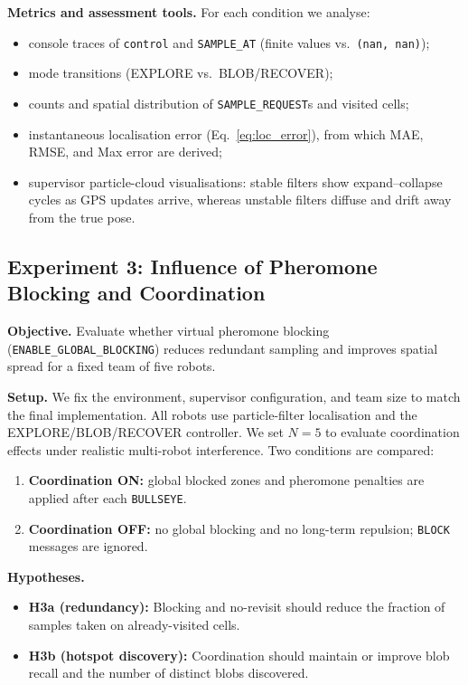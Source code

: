 \documentclass[lettersize,journal]{IEEEtran}
\begin{document}
\textbf{Metrics and assessment tools.}
For each condition we analyse:
\begin{itemize}
    \item console traces of \texttt{control} and \texttt{SAMPLE\_AT}
    (finite values vs.\ \texttt{(nan, nan)});
    \item mode transitions (EXPLORE vs.\ BLOB/RECOVER);
    \item counts and spatial distribution of \texttt{SAMPLE\_REQUEST}s
    and visited cells;
    \item instantaneous localisation error (Eq.~\eqref{eq:loc_error}), from
    which MAE, RMSE, and Max error are derived;
    \item supervisor particle-cloud visualisations: stable filters show
    expand--collapse cycles as GPS updates arrive, whereas unstable filters
    diffuse and drift away from the true pose.
\end{itemize}

\subsection{Experiment 3: Influence of Pheromone Blocking and Coordination }

\textbf{Objective.}
Evaluate whether virtual pheromone blocking
(\texttt{ENABLE\_GLOBAL\_BLOCKING}) reduces redundant sampling and improves
spatial spread for a fixed team of five robots.

\textbf{Setup.}
We fix the environment, supervisor configuration, and team size to match the
final implementation. All robots use particle-filter localisation and the
EXPLORE/BLOB/RECOVER controller. We set $N=5$ to evaluate coordination effects
under realistic multi-robot interference. Two conditions are compared:
\begin{enumerate}
    \item \textbf{Coordination ON:} global blocked zones and pheromone penalties
    are applied after each \texttt{BULLSEYE}.
    \item \textbf{Coordination OFF:} no global blocking and no long-term
    repulsion; \texttt{BLOCK} messages are ignored.
\end{enumerate}

\textbf{Hypotheses.}
\begin{itemize}
    \item \textbf{H3a (redundancy):} Blocking and no-revisit should reduce the
    fraction of samples taken on already-visited cells.
    \item \textbf{H3b (hotspot discovery):} Coordination should maintain or
    improve blob recall and the number of distinct blobs discovered.
\end{itemize}
\end{document}
